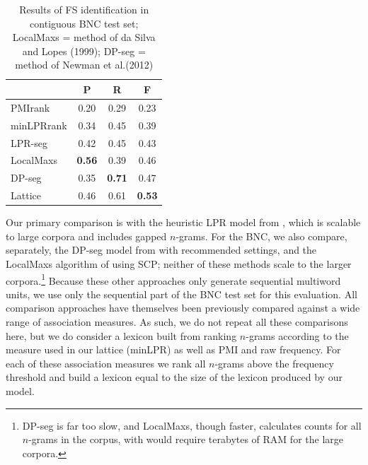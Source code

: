 \documentclass[11pt,letterpaper]{article}
\makeatletter
\def \al {al.\@ }
\makeatother
\begin{document}
 \begin{table}[!bt]
 
 \begin{center}
	
	 \begin{tabular}{lccc}

       \toprule
			& P & R & F\\
			 \midrule
			PMIrank & 0.20 & 0.29 & 0.23 \\
			minLPRrank & 0.34 & 0.45 & 0.39 \\
			LPR-seg & 0.42 & 0.45 & 0.43 \\
			LocalMaxs & \bf{0.56} & 0.39 & 0.46 \\
			DP-seg & 0.35 & \bf{0.71} & 0.47 \\
  \midrule
			Lattice & 0.46 & 0.61 & \bf{0.53} \\
       \bottomrule
 \end{tabular}
  \caption{ Results of FS identification in contiguous BNC test set; LocalMaxs = method of da Silva and Lopes (1999); DP-seg = method of Newman et \al (2012)}
	\label{tab:BNC}

 \end{center}

 \end{table}	



 Our primary comparison is with the heuristic LPR model from , which is scalable to large corpora and includes gapped $n$-grams. For the BNC, we also compare, separately, the DP-seg model from  with recommended settings, and the LocalMaxs algorithm of  using SCP; neither of these methods scale to the larger corpora.\footnote{DP-seg is far too slow, and LocalMaxs, though faster, calculates counts for all $n$-grams in the corpus, with would require terabytes of RAM for the large corpora.} Because these other approaches only generate sequential multiword units, we use only the sequential part of the BNC test set for this evaluation. All comparison approaches have themselves been previously compared against a wide range of association measures. As such, we do not repeat all these comparisons here, but we do consider a lexicon built from ranking $n$-grams according to the measure used in our lattice (minLPR) as well as PMI and raw frequency. For each of these association measures we rank all $n$-grams above the frequency threshold and build a lexicon equal to the size of the lexicon produced by our model.
\end{document}
